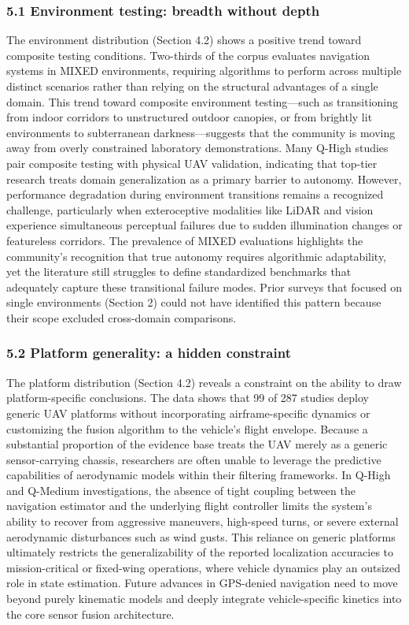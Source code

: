 \documentclass[conference]{IEEEtran}
\begin{document}
\subsubsection{5.1 Environment testing: breadth without depth}


The environment distribution (Section 4.2) shows a positive trend toward composite testing conditions. Two-thirds of the corpus evaluates navigation systems in MIXED environments, requiring algorithms to perform across multiple distinct scenarios rather than relying on the structural advantages of a single domain. This trend toward composite environment testing—such as transitioning from indoor corridors to unstructured outdoor canopies, or from brightly lit environments to subterranean darkness—suggests that the community is moving away from overly constrained laboratory demonstrations. Many Q-High studies pair composite testing with physical UAV validation, indicating that top-tier research treats domain generalization as a primary barrier to autonomy. However, performance degradation during environment transitions remains a recognized challenge, particularly when exteroceptive modalities like LiDAR and vision experience simultaneous perceptual failures due to sudden illumination changes or featureless corridors. The prevalence of MIXED evaluations highlights the community's recognition that true autonomy requires algorithmic adaptability, yet the literature still struggles to define standardized benchmarks that adequately capture these transitional failure modes. Prior surveys that focused on single environments (Section 2) could not have identified this pattern because their scope excluded cross-domain comparisons.


\subsubsection{5.2 Platform generality: a hidden constraint}


The platform distribution (Section 4.2) reveals a constraint on the ability to draw platform-specific conclusions. The data shows that 99 of 287 studies deploy generic UAV platforms without incorporating airframe-specific dynamics or customizing the fusion algorithm to the vehicle's flight envelope. Because a substantial proportion of the evidence base treats the UAV merely as a generic sensor-carrying chassis, researchers are often unable to leverage the predictive capabilities of aerodynamic models within their filtering frameworks. In Q-High and Q-Medium investigations, the absence of tight coupling between the navigation estimator and the underlying flight controller limits the system's ability to recover from aggressive maneuvers, high-speed turns, or severe external aerodynamic disturbances such as wind gusts. This reliance on generic platforms ultimately restricts the generalizability of the reported localization accuracies to mission-critical or fixed-wing operations, where vehicle dynamics play an outsized role in state estimation. Future advances in GPS-denied navigation need to move beyond purely kinematic models and deeply integrate vehicle-specific kinetics into the core sensor fusion architecture.
\end{document}

